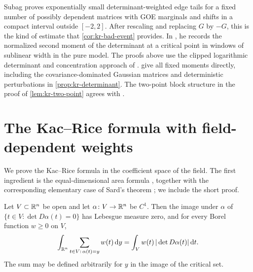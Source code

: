 \begin{remark}\label{rem:kr-det-lit}
Subag \cite[Lemma~21]{Subag2017complexity} proves exponentially small determinant-weighted edge tails for a fixed number of possibly dependent matrices with GOE marginals and shifts in a compact interval outside $[-2,2]$. After rescaling and replacing $G$ by $-G$, this is the kind of estimate that \cref{cor:kr-bad-event} provides. In \cite[Lemma~38, (12.25)]{Subag2017geometry}, he records the normalized second moment of the determinant at a critical point in windows of sublinear width in the pure model. The proofs above use the clipped logarithmic determinant and concentration approach of \cite[proof of Lemma~21, (8.13)--(8.18)]{Subag2017complexity}.  give all fixed moments directly, including the covariance-dominated Gaussian matrices and deterministic perturbations in \cref{prop:kr-determinant}. The two-point block structure in the proof of \cref{lem:kr-two-point} agrees with \cite[Lemma~15]{BenArousSubagZeitouni2020}.
\end{remark}

\section{The Kac--Rice formula with field-dependent weights}\label{sec:kr-formula}

We prove the Kac--Rice formula in the coefficient space of the field. The first ingredient is the equal-dimensional area formula \cite{Federer1969}, together with the corresponding elementary case of Sard's theorem \cite{Sard1942}; we include the short proof.

\begin{lemma}\label{lem:kr-area}
Let $V\subset\mathbb R^n$ be open and let $\alpha\colon V\to\mathbb R^n$ be $C^1$. Then the image under $\alpha$ of $\{t\in V:\det D\alpha(t)=0\}$ has Lebesgue measure zero, and for every Borel function $w\ge0$ on $V$,
\begin{equation}\label{eq:kr-area}
\int_{\mathbb R^n}\sum_{t\in V:\,\alpha(t)=y}w(t)\,\mathrm d y=\int_Vw(t)\,|\det D\alpha(t)|\,\mathrm d t.
\end{equation}
The sum may be defined arbitrarily for $y$ in the image of the critical set.
\end{lemma}

